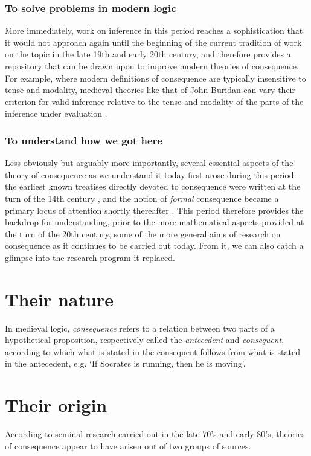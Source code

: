 \documentclass[]{article}
\begin{document}
\subsubsection{To solve problems in modern logic}
More immediately, 
work on inference in this period reaches a sophistication that it would not approach again until the beginning of the current tradition of work on the topic in the late 19th and early 20th century, 
and therefore provides a repository that can be drawn upon to improve modern theories of consequence. 
For example, 
where modern definitions of consequence are typically insensitive to tense and modality, 
medieval theories like that of John Buridan can vary their criterion for valid inference relative to the tense and modality of the parts of the inference under evaluation \autocite[63]{Read2015}.

\subsubsection{To understand how we got here}
Less obviously but arguably more importantly, 
several essential aspects of the theory of consequence as we understand it today first arose during this period: 
the earliest known treatises directly devoted to consequence were written at the turn of the 14th century \autocite{Archambault2017d}, 
and the notion of \emph{formal} consequence became a primary locus of attention shortly thereafter \autocite{DutilhNovaes2012a}. 
This period therefore provides the backdrop for understanding, 
prior to the more mathematical aspects provided at the turn of the 20th century, 
some of the more general aims of research on consequence as it continues to be carried out today. 
From it, we can also catch a glimpse into the research program it replaced. 

\section{Their nature}
In medieval logic, 
\emph{consequence} refers to a relation between two parts of a hypothetical proposition, 
respectively called the \emph{antecedent} and \emph{consequent}, 
according to which what is stated in the consequent follows from what is stated in the antecedent, 
e.g. `If Socrates is running, then he is moving'. 

\section{Their origin}
According to seminal research carried out in the late 70's and early 80's,
theories of consequence appear to have arisen out of two groups of sources. 
\end{document}
